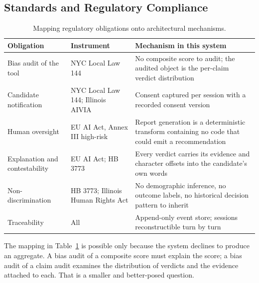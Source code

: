 \subsection{Standards and Regulatory Compliance}

\begin{table}[t]
\caption{Mapping regulatory obligations onto architectural mechanisms.}
\label{tab:compliance}
\small
\begin{tabular}{@{}p{3.4cm}p{5.4cm}p{6.4cm}@{}}
\toprule
Obligation & Instrument & Mechanism in this system \\
\midrule
Bias audit of the tool & NYC Local Law 144 & No composite score to audit; the
audited object is the per-claim verdict distribution \\
Candidate notification & NYC Local Law 144; Illinois AIVIA & Consent captured
per session with a recorded consent version \\
Human oversight & EU AI Act, Annex III high-risk & Report generation is a
deterministic transform containing no code that could emit a recommendation \\
Explanation and contestability & EU AI Act; HB 3773 & Every verdict carries its
evidence and character offsets into the candidate's own words \\
Non-discrimination & HB 3773; Illinois Human Rights Act & No demographic
inference, no outcome labels, no historical decision pattern to inherit \\
Traceability & All & Append-only event store; sessions reconstructible turn by
turn \\
\bottomrule
\end{tabular}
\end{table}

The mapping in Table~\ref{tab:compliance} is possible only because the system
declines to produce an aggregate. A bias audit of a composite score must explain
the score; a bias audit of a claim audit examines the distribution of verdicts and the evidence attached to each. That is a smaller and better-posed question.
